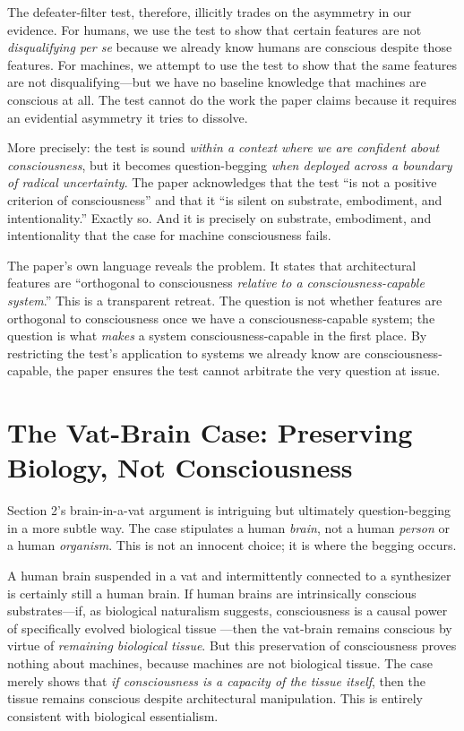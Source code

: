 \documentclass[11pt]{article}
\begin{document}
The defeater-filter test, therefore, illicitly trades on the asymmetry in our evidence. For humans, we use the test to show that certain features are not \textit{disqualifying per se} because we already know humans are conscious despite those features. For machines, we attempt to use the test to show that the same features are not disqualifying---but we have no baseline knowledge that machines are conscious at all. The test cannot do the work the paper claims because it requires an evidential asymmetry it tries to dissolve.

More precisely: the test is sound \textit{within a context where we are confident about consciousness}, but it becomes question-begging \textit{when deployed across a boundary of radical uncertainty}. The paper acknowledges that the test ``is not a positive criterion of consciousness'' and that it ``is silent on substrate, embodiment, and intentionality.'' Exactly so. And it is precisely on substrate, embodiment, and intentionality that the case for machine consciousness fails.

The paper's own language reveals the problem. It states that architectural features are ``orthogonal to consciousness \textit{relative to a consciousness-capable system}.'' This is a transparent retreat. The question is not whether features are orthogonal to consciousness once we have a consciousness-capable system; the question is what \textit{makes} a system consciousness-capable in the first place. By restricting the test's application to systems we already know are consciousness-capable, the paper ensures the test cannot arbitrate the very question at issue.

\section{The Vat-Brain Case: Preserving Biology, Not Consciousness}

Section 2's brain-in-a-vat argument is intriguing but ultimately question-begging in a more subtle way. The case stipulates a human \textit{brain}, not a human \textit{person} or a human \textit{organism}. This is not an innocent choice; it is where the begging occurs.

A human brain suspended in a vat and intermittently connected to a synthesizer is certainly still a human brain. If human brains are intrinsically conscious substrates---if, as biological naturalism suggests, consciousness is a causal power of specifically evolved biological tissue \citep{searle1992}---then the vat-brain remains conscious by virtue of \textit{remaining biological tissue}. But this preservation of consciousness proves nothing about machines, because machines are not biological tissue. The case merely shows that \textit{if consciousness is a capacity of the tissue itself}, then the tissue remains conscious despite architectural manipulation. This is entirely consistent with biological essentialism.
\end{document}
